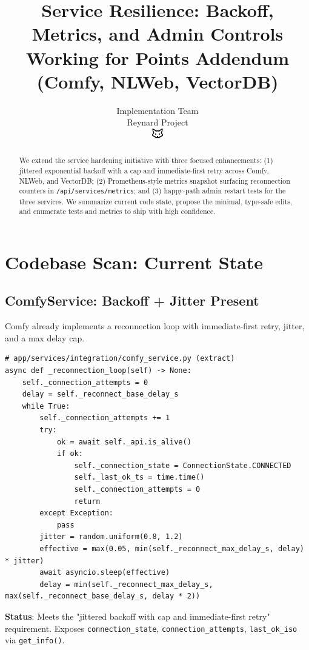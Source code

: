 \documentclass[11pt]{article}
\title{\textbf{Service Resilience: Backoff, Metrics, and Admin Controls}\\
\Large Working for Points Addendum (Comfy, NLWeb, VectorDB)}
\author{Implementation Team\\Reynard Project\\\includegraphics[width=0.5cm]{favicon.pdf}}
\begin{document}
\maketitle

\begin{abstract}
We extend the service hardening initiative with three focused enhancements: (1) jittered exponential backoff with a cap and immediate-first retry across Comfy, NLWeb, and VectorDB; (2) Prometheus-style metrics snapshot surfacing reconnection counters in \texttt{/api/services/metrics}; and (3) happy-path admin restart tests for the three services. We summarize current code state, propose the minimal, type-safe edits, and enumerate tests and metrics to ship with high confidence.
\end{abstract}

\tableofcontents
\newpage

\section{Codebase Scan: Current State}

\subsection{ComfyService: Backoff + Jitter Present}
Comfy already implements a reconnection loop with immediate-first retry, jitter, and a max delay cap.

\begin{verbatim}
# app/services/integration/comfy_service.py (extract)
async def _reconnection_loop(self) -> None:
    self._connection_attempts = 0
    delay = self._reconnect_base_delay_s
    while True:
        self._connection_attempts += 1
        try:
            ok = await self._api.is_alive()
            if ok:
                self._connection_state = ConnectionState.CONNECTED
                self._last_ok_ts = time.time()
                self._connection_attempts = 0
                return
        except Exception:
            pass
        jitter = random.uniform(0.8, 1.2)
        effective = max(0.05, min(self._reconnect_max_delay_s, delay) * jitter)
        await asyncio.sleep(effective)
        delay = min(self._reconnect_max_delay_s, max(self._reconnect_base_delay_s, delay * 2))
\end{verbatim}

\textbf{Status}: Meets the "jittered backoff with cap and immediate-first retry" requirement. Exposes \texttt{connection\_state}, \texttt{connection\_attempts}, \texttt{last\_ok\_iso} via \texttt{get\_info()}.
\end{document}
